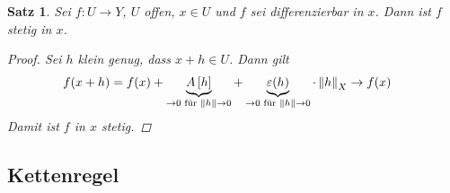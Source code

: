 \documentclass[11pt, twoside, a4paper]{article}
\theoremstyle{plain}
\newtheorem{satz}[blockelement]{Satz}
\numberwithin{equation}{subsection}
\newcommand{\of}[1]{\mathopen{}\mathclose{}\bgroup\left(#1\aftergroup\egroup\right)}
\newcommand{\norm}[1]{\left\lVert#1\right\rVert}
\newcommand{\interv}[1]{\left[#1\right]}
\newcommand{\fromto}{\rightarrow{}}
\begin{document}
    \begin{satz} %
        Sei $f: U\fromto Y$, $U$ offen, $x\in U$ und $f$ sei differenzierbar in $x$. Dann ist $f$ stetig in $x$.
        \begin{proof}
            Sei $h$ klein genug, dass $x+h \in U$. Dann gilt
            \begin{align*}
                f\of{x+h} &= f\of{x} + \underbrace{A\interv{h}}_{\fromto 0 \text{ für } \norm{h}\fromto 0} + \underbrace{\varepsilon\of{h}}_{\fromto 0 \text{ für } \norm{h}\fromto 0}\cdot\norm{h}_X\fromto f\of{x}
            \end{align*}
            Damit ist $f$ in $x$ stetig.
        \end{proof}
    \end{satz}

    \subsection{Kettenregel}
\end{document}
